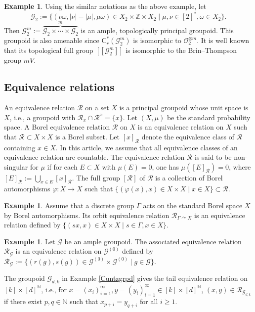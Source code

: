 \documentclass{amsart}
\newcommand{\G}{\mathcal{G}}
\newcommand{\R}{\mathcal{R}}
\renewcommand{\phi}{\varphi}
\theoremstyle{remark}
\theoremstyle{definition}
\newtheorem{example}[theorem]{Example}
\begin{document}
\begin{example}\label{BrinThompson}
Using the similar notations as the above example, let
\[
\mathcal{G}_2 := \{ (\nu \omega , |\nu| - |\mu|, \mu \omega) \in X_2 \times \mathbb{Z} \times X_2 \mid \mu, \nu \in [2]^* , \omega \in X_2 \}.
\]
Then $\G _2^m := \overbrace{\G _2 \times \cdots \times \G _2}^{m}$ is an ample, topologically principal groupoid.
This groupoid is also amenable since $\mathrm{C}_r^*(\G_2^m)$ is isomorphic to $\mathcal{O}_2^{\otimes m}$.
It is well known that its topological full group $[[ \G _2^m ]]$ is isomorphic to the Brin--Thompson group $mV$.

\end{example}



\subsection{Equivalence relations}
An equivalence relation $\R$ on a set $X$ is a principal groupoid whose unit space is $X$, i.e., a groupoid with $\R _x \cap \R ^x = \{ x \}$. 
Let $(X, \mu)$ be the standard probability space.
A Borel equivalence relation $\R$ on $X$ is an equivalence relation on $X$ such that $\R \subset X \times X$ is a Borel subset.
Let $[x]_{\R}$ denote the equivalence class of $\R$ containing $x \in X$.
In this article, we assume that all equivalence classes of an equivalence relation are countable.
The equivalence relation $\R$ is said to be non-singular for $\mu$ if for each $E \subset X$ with $\mu (E)=0$, one has $\mu ( [E]_{\R})=0$, where $[E]_{\R} := \bigcup _{x \in E} [x]_{\R}$.
The full group $[ \R ]$ of $\R$ is a collection of Borel automorphisms $\phi \colon X \to X$ such that $\{ (\phi (x), x ) \in X \times X \mid x \in X \} \subset \R$.

\begin{example}
Assume that a discrete group $\Gamma$ acts on the standard Borel space $X$ by Borel automorphisms.
Its orbit equivalence relation $\R_{\Gamma \curvearrowright X}$ is an equivalence relation defined by $\{ (sx, x) \in X \times X \mid s \in \Gamma, x \in X \}$.
\end{example}

\begin{example}
Let $\G$ be an ample groupoid.
The associated equivalence relation $\R_\G$ is an equivalence relation on $\G^{(0)}$ defined by $\R_\G := \{ (r(g), s(g)) \in \G ^{(0)} \times \G^{(0)} \mid g \in \G \}$.

The groupoid $\G_{d, k}$ in Example \ref{Cuntzgrpd} gives the tail equivalence relation on $[k] \times [d]^{\mathbb{N}}$, i.e., for $x=(x_i)_{i=1}^{\infty}, y=(y_i)_{i=1}^{\infty} \in [k] \times [d]^{\mathbb{N}}$, $(x, y) \in \R_{\G_{d, k}}$ if there exist $p, q \in \mathbb{N}$ such that $x_{p+i} = y_{q+i}$ for all $i \geq 1$.
\end{example}
\end{document}
